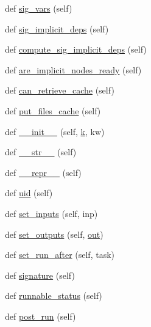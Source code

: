 \begin{DoxyCompactItemize}
\item 
def \hyperlink{classwaflib_1_1_task_1_1_task_acffd01af005b390787b85239ac207282}{sig\+\_\+vars} (self)
\item 
def \hyperlink{classwaflib_1_1_task_1_1_task_a60ce159ef323481b09fcea4decb9e231}{sig\+\_\+implicit\+\_\+deps} (self)
\item 
def \hyperlink{classwaflib_1_1_task_1_1_task_adf3f63ea77fbca592ebc4244ba57887d}{compute\+\_\+sig\+\_\+implicit\+\_\+deps} (self)
\item 
def \hyperlink{classwaflib_1_1_task_1_1_task_a89612661d2073f53f62d7306a6c2238d}{are\+\_\+implicit\+\_\+nodes\+\_\+ready} (self)
\item 
def \hyperlink{classwaflib_1_1_task_1_1_task_a2085cfed25d49bed519af381621b29e7}{can\+\_\+retrieve\+\_\+cache} (self)
\item 
def \hyperlink{classwaflib_1_1_task_1_1_task_adf5e108580503738b2ab58eb1b56c10f}{put\+\_\+files\+\_\+cache} (self)
\item 
def \hyperlink{classwaflib_1_1_task_1_1_task_a566ab609bec4499aeab7bcd6f77f156e}{\+\_\+\+\_\+init\+\_\+\+\_\+} (self, \hyperlink{rfft2d_test_m_l_8m_adc468c70fb574ebd07287b38d0d0676d}{k}, kw)
\item 
def \hyperlink{classwaflib_1_1_task_1_1_task_a2507ae71718d699910a9dd8708664630}{\+\_\+\+\_\+str\+\_\+\+\_\+} (self)
\item 
def \hyperlink{classwaflib_1_1_task_1_1_task_ac05a045661750df307593224089759da}{\+\_\+\+\_\+repr\+\_\+\+\_\+} (self)
\item 
def \hyperlink{classwaflib_1_1_task_1_1_task_a910c51ea67c1c47ac40690bbba73b76a}{uid} (self)
\item 
def \hyperlink{classwaflib_1_1_task_1_1_task_a647c971bbca84d07daeff8d24f70ea18}{set\+\_\+inputs} (self, inp)
\item 
def \hyperlink{classwaflib_1_1_task_1_1_task_a8e650ed64c8370720574ebd8481a4f48}{set\+\_\+outputs} (self, \hyperlink{latency_8c_a71fd1c281affec034757279e4f91c50b}{out})
\item 
def \hyperlink{classwaflib_1_1_task_1_1_task_a84292828c5a6cf3282027ed8ce5c7822}{set\+\_\+run\+\_\+after} (self, task)
\item 
def \hyperlink{classwaflib_1_1_task_1_1_task_a48e55f13de8172b779a4e63794c7f44f}{signature} (self)
\item 
def \hyperlink{classwaflib_1_1_task_1_1_task_a2a281aaea77a0732f72103cfe4bc56c4}{runnable\+\_\+status} (self)
\item 
def \hyperlink{classwaflib_1_1_task_1_1_task_ac7c2e0bf22acd7d96399b1ca7f342232}{post\+\_\+run} (self)

\end{DoxyCompactItemize}
